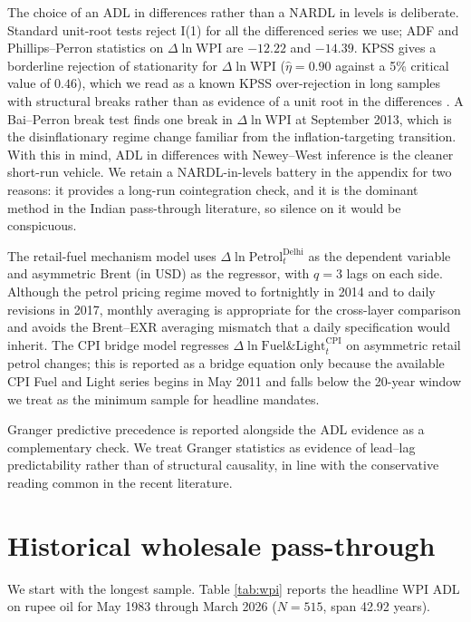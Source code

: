 \documentclass[11pt,a4paper]{article}
\begin{document}
The choice of an ADL in differences rather than a NARDL in levels is deliberate. Standard unit-root tests reject I(1) for all the differenced series we use; ADF and Phillips--Perron statistics on $\Delta \ln \mathrm{WPI}$ are $-12.22$ and $-14.39$. KPSS gives a borderline rejection of stationarity for $\Delta \ln \mathrm{WPI}$ ($\hat\eta = 0.90$ against a 5\% critical value of $0.46$), which we read as a known KPSS over-rejection in long samples with structural breaks rather than as evidence of a unit root in the differences \citep[see][]{rbi2014}. A Bai--Perron break test finds one break in $\Delta \ln \mathrm{WPI}$ at September 2013, which is the disinflationary regime change familiar from the inflation-targeting transition. With this in mind, ADL in differences with Newey--West inference is the cleaner short-run vehicle. We retain a NARDL-in-levels battery in the appendix for two reasons: it provides a long-run cointegration check, and it is the dominant method in the Indian pass-through literature, so silence on it would be conspicuous.

The retail-fuel mechanism model uses $\Delta \ln \mathrm{Petrol}_t^{\mathrm{Delhi}}$ as the dependent variable and asymmetric Brent (in USD) as the regressor, with $q = 3$ lags on each side. Although the petrol pricing regime moved to fortnightly in 2014 and to daily revisions in 2017, monthly averaging is appropriate for the cross-layer comparison and avoids the Brent--EXR averaging mismatch that a daily specification would inherit. The CPI bridge model regresses $\Delta \ln \mathrm{Fuel\&Light}^{\mathrm{CPI}}_t$ on asymmetric retail petrol changes; this is reported as a bridge equation only because the available CPI Fuel and Light series begins in May 2011 and falls below the 20-year window we treat as the minimum sample for headline mandates.

Granger predictive precedence is reported alongside the ADL evidence as a complementary check. We treat Granger statistics as evidence of lead--lag predictability rather than of structural causality, in line with the conservative reading common in the recent literature.

\section{Historical wholesale pass-through}
\label{sec:wpi}

We start with the longest sample. Table \ref{tab:wpi} reports the headline WPI ADL on rupee oil for May 1983 through March 2026 ($N=515$, span 42.92 years).
\end{document}
